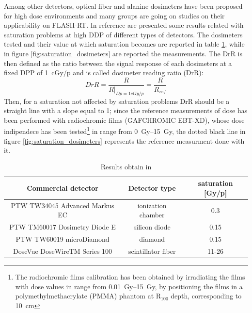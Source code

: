             Among  other detectors, optical fiber and alanine dosimeters have been proposed for high dose environments and many groups are going on studies on their applicability on FLASH-RT.  
            In reference \cite{FLASH_dosimeters} are presented some results related with saturation problems at high DDP of different types of detectors. The dosimeters tested and their value at which saturation becomes are reported in table \ref{tab:dosimeters_saturation}, while in figure \ref{fig:saturation_dosimeters} are reported the measurements. 
            The DrR is then defined as the ratio between the signal response of each dosimeters at a fixed DPP of \SI{1}{cGy/p} and is called dosimeter reading ratio (DrR): 
            \begin{equation}
                DrR = \frac{R}{R|_{Dp = 1cGy/p}} = \frac{R}{R_{ref}}
            \end{equation} 
            Then, for a saturation not affected by saturation problems DrR should be a straight line with a slope equal to 1; since the  reference measurements of dose has been performed with radiochromic films (GAFCHROMIC EBT-XD), whose dose indipendece has been tested\footnote{The radiochromic films calibration has been obtained by irradiating the films with dose values in range from \SIrange{0.01}{15}{Gy}, by positioning the films in a polymethylmethacrylate (PMMA) phantom at R$_{100}$ depth, corresponding to \SI{10}{cm}} in range from \SIrange{0}{15}{Gy}, the dotted black line in figure \ref{fig:saturation_dosimeters} represents the reference measurment done with it. 
            \begin{table}
                \begin{center}
                \begin{tabular}{|c | c |c |}
                \hline
                Commercial detector & Detector type & saturation [Gy/p]\\
                \hline
                \hline
                PTW TW34045 Advanced Markus EC & ionization chamber & 0.3 \\
                PTW TM60017 Dosimetry Diode E & silicon diode & 0.15\\
                PTW TW60019 microDiamond & diamond  &  0.15 \\
                DoseVue DoseWireTM Series 100 & scintillator fiber & 11-26\\
                \hline
                \end{tabular}
                \caption{Results obtain in \cite{FLASH_dosimeters}}
                \label{tab:dosimeters_saturation}
                \end{center}
            \end{table}
